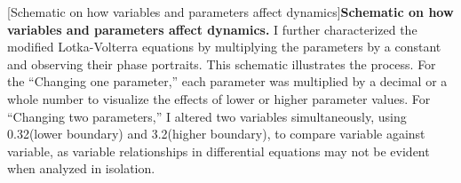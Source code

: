 \begin{centering}
\captionsetup{parbox=none}
[Schematic on how variables and parameters affect dynamics]{\textbf{Schematic on how variables and parameters affect dynamics.} I further characterized the modified Lotka-Volterra equations by multiplying the parameters by a constant and observing their phase portraits. This schematic illustrates the process. For the “Changing one parameter,” each parameter was multiplied by a decimal or a whole number to visualize the effects of lower or higher parameter values. For “Changing two parameters,” I altered two variables simultaneously, using 0.32\times (lower boundary) and 3.2\times (higher boundary), to compare variable against variable, as variable relationships in differential equations may not be evident when analyzed in isolation.}
\label{p2:S7a}
\end{centering}


